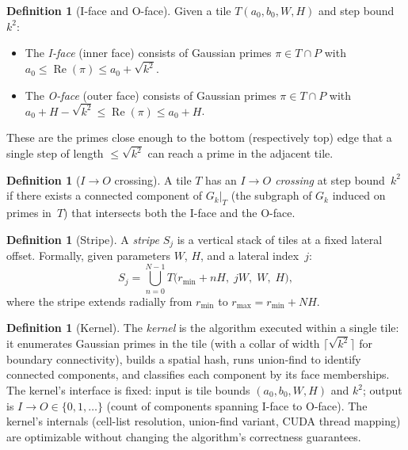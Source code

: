 \documentclass[11pt,a4paper]{article}
\theoremstyle{definition}
\newtheorem{definition}[theorem]{Definition}
\theoremstyle{remark}
\newcommand{\IO}{I{\to}O}
\begin{document}
\begin{definition}[I-face and O-face]\label{def:faces}
Given a tile $T(a_0, b_0, W, H)$ and step bound~$k^2$:
\begin{itemize}
  \item The \emph{I-face} (inner face) consists of Gaussian primes
    $\pi \in T \cap P$ with $a_0 \le \operatorname{Re}(\pi) \le a_0 + \sqrt{k^2}$.
  \item The \emph{O-face} (outer face) consists of Gaussian primes
    $\pi \in T \cap P$ with $a_0 + H - \sqrt{k^2} \le \operatorname{Re}(\pi) \le a_0 + H$.
\end{itemize}
These are the primes close enough to the bottom (respectively top) edge
that a single step of length $\le \sqrt{k^2}$ can reach a prime in the
adjacent tile.
\end{definition}

\begin{definition}[$\IO$ crossing]\label{def:io}
A tile $T$ has an \emph{$\IO$ crossing} at step bound~$k^2$ if there
exists a connected component of $G_k|_T$ (the subgraph of $G_k$
induced on primes in~$T$) that intersects both the I-face and the O-face.
\end{definition}

\begin{definition}[Stripe]\label{def:stripe}
A \emph{stripe} $S_j$ is a vertical stack of tiles at a fixed lateral
offset.  Formally, given parameters $W$, $H$, and a lateral
index~$j$:
\[
  S_j = \bigcup_{n=0}^{N-1} T\bigl(r_{\min} + nH,\; jW,\; W,\; H\bigr),
\]
where the stripe extends radially from $r_{\min}$ to
$r_{\max} = r_{\min} + NH$.
\end{definition}

\begin{definition}[Kernel]\label{def:kernel}
The \emph{kernel} is the algorithm executed within a single tile: it
enumerates Gaussian primes in the tile (with a collar of width
$\lceil\sqrt{k^2}\rceil$ for boundary connectivity), builds a spatial
hash, runs union-find to identify connected components, and classifies
each component by its face memberships.  The kernel's interface is
fixed: input is tile bounds $(a_0, b_0, W, H)$ and $k^2$; output is
$\IO \in \{0, 1, \ldots\}$ (count of components spanning I-face to
O-face).  The kernel's internals (cell-list resolution, union-find
variant, CUDA thread mapping) are optimizable without changing the
algorithm's correctness guarantees.
\end{definition}
\end{document}
